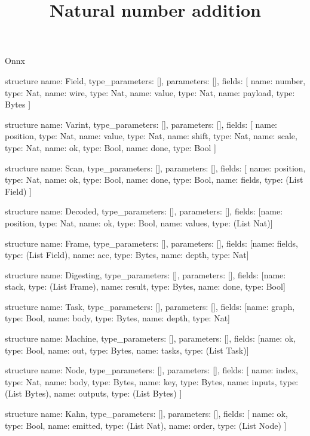 \begin{lexlean}{Onnx}
\title{Natural number addition}
\begin{semanticmodule}
structure{
  name: Field,
  type_parameters: [],
  parameters: [],
  fields: [
    {name: number, type: Nat},
    {name: wire, type: Nat},
    {name: value, type: Nat},
    {name: payload, type: Bytes}
  ]
}

structure{
  name: Varint,
  type_parameters: [],
  parameters: [],
  fields: [
    {name: position, type: Nat},
    {name: value, type: Nat},
    {name: shift, type: Nat},
    {name: scale, type: Nat},
    {name: ok, type: Bool},
    {name: done, type: Bool}
  ]
}

structure{
  name: Scan,
  type_parameters: [],
  parameters: [],
  fields: [
    {name: position, type: Nat},
    {name: ok, type: Bool},
    {name: done, type: Bool},
    {name: fields, type: (List Field)}
  ]
}

structure{
  name: Decoded,
  type_parameters: [],
  parameters: [],
  fields: [{name: position, type: Nat}, {name: ok, type: Bool}, {name: values, type: (List Nat)}]
}

structure{
  name: Frame,
  type_parameters: [],
  parameters: [],
  fields: [{name: fields, type: (List Field)}, {name: acc, type: Bytes}, {name: depth, type: Nat}]
}

structure{
  name: Digesting,
  type_parameters: [],
  parameters: [],
  fields: [{name: stack, type: (List Frame)}, {name: result, type: Bytes}, {name: done, type: Bool}]
}

structure{
  name: Task,
  type_parameters: [],
  parameters: [],
  fields: [{name: graph, type: Bool}, {name: body, type: Bytes}, {name: depth, type: Nat}]
}

structure{
  name: Machine,
  type_parameters: [],
  parameters: [],
  fields: [{name: ok, type: Bool}, {name: out, type: Bytes}, {name: tasks, type: (List Task)}]
}

structure{
  name: Node,
  type_parameters: [],
  parameters: [],
  fields: [
    {name: index, type: Nat},
    {name: body, type: Bytes},
    {name: key, type: Bytes},
    {name: inputs, type: (List Bytes)},
    {name: outputs, type: (List Bytes)}
  ]
}

structure{
  name: Kahn,
  type_parameters: [],
  parameters: [],
  fields: [
    {name: ok, type: Bool},
    {name: emitted, type: (List Nat)},
    {name: order, type: (List Node)}
  ]
}


\end{semanticmodule}
\end{lexlean}
